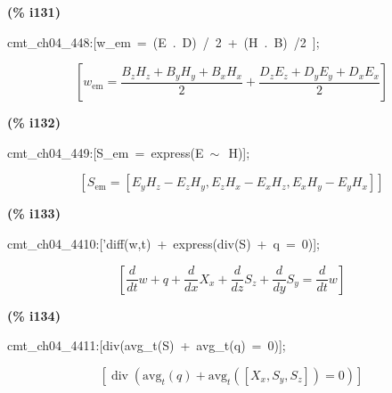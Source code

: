\documentclass[fleqn]{article}
\begin{document}
\noindent
\begin{minipage}[t]{4.000000em}\color{red}\bfseries
(\% i131)	
\end{minipage}
\begin{minipage}[t]{\textwidth}\color{blue}
cmt\_ch04\_448:[w\_em\ =\ (E\ .\ D)\ /\ 2\ +\ (H\ .\ B)\ /2\ ];
\end{minipage}
\[\displaystyle \tag{\% o131} 
\left[ {w_{\ensuremath{\mathrm{em}}}}=\frac{{B_z} {H_z}+{B_y} {H_y}+{B_x} {H_x}}{2}+\frac{{D_z} {E_z}+{D_y} {E_y}+{D_x} {E_x}}{2}\right] \mbox{}
\]


\noindent
\begin{minipage}[t]{4.000000em}\color{red}\bfseries
(\% i132)	
\end{minipage}
\begin{minipage}[t]{\textwidth}\color{blue}
cmt\_ch04\_449:[S\_em\ =\ express(E\ \ensuremath{\sim\ }\ H)];
\end{minipage}
\[\displaystyle \tag{\% o132} 
\left[ {S_{\ensuremath{\mathrm{em}}}}=\left[ {E_y} {H_z}-{E_z} {H_y}\operatorname{,}{E_z} {H_x}-{E_x} {H_z}\operatorname{,}{E_x} {H_y}-{E_y} {H_x}\right] \right] \mbox{}
\]


\noindent
\begin{minipage}[t]{4.000000em}\color{red}\bfseries
(\% i133)	
\end{minipage}
\begin{minipage}[t]{\textwidth}\color{blue}
cmt\_ch04\_4410:['diff(w,t)\ +\ express(div(S)\ +\ q\ =\ 0)];
\end{minipage}
\[\displaystyle \tag{\% o133} 
\left[ \frac{d}{d t} w+q+\frac{d}{d x} {X_x}+\frac{d}{d z} {S_z}+\frac{d}{d y} {S_y}=\frac{d}{d t} w\right] \mbox{}
\]


\noindent
\begin{minipage}[t]{4.000000em}\color{red}\bfseries
(\% i134)	
\end{minipage}
\begin{minipage}[t]{\textwidth}\color{blue}
cmt\_ch04\_4411:[div(avg\_t(S)\ +\ avg\_t(q)\ =\ 0)];
\end{minipage}
\[\displaystyle \tag{\% o134} 
\left[ \operatorname{div}\left( {{\ensuremath{\mathrm{avg}}}_t}(q)+{{\ensuremath{\mathrm{avg}}}_t}\left( \left[ {X_x}\operatorname{,}{S_y}\operatorname{,}{S_z}\right] \right) =0\right) \right] \mbox{}
\]
\end{document}
